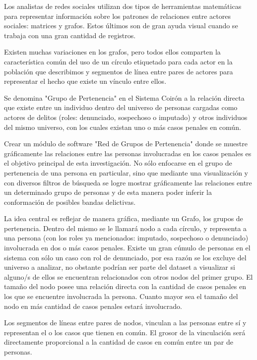 Los analistas de redes sociales utilizan dos tipos de herramientas matemáticas para representar información sobre los patrones de relaciones entre actores sociales: matrices y grafos. Estos últimos son de gran ayuda visual cuando se trabaja con una gran cantidad de registros.

Existen muchas variaciones en los grafos, pero todos ellos comparten la característica común del uso de un círculo etiquetado para cada actor en la población que describimos y segmentos de línea entre pares de actores para representar el hecho que existe un vínculo entre ellos.

Se denomina "Grupo de Pertenencia" en el Sistema Coirón a la relación directa que existe entre un individuo dentro del universo de personas cargadas como actores de delitos (roles: denunciado, sospechoso o imputado) y otros individuos del mismo universo, con los cuales existan uno o más casos penales en común.

Crear un módulo de software "Red de Grupos de Pertenencia" donde se muestre gráficamente las relaciones entre las personas involucradas en los casos penales es el objetivo principal de esta investigación. No sólo enfocarse en el grupo de pertenencia de una persona en particular, sino que mediante una visualización y con diversos filtros de búsqueda se logre mostrar gráficamente las relaciones entre un determinado grupo de personas y de esta manera poder inferir la conformación de posibles bandas delictivas.

La idea central es reflejar de manera gráfica, mediante un Grafo, los grupos de pertenencia. Dentro del mismo se le llamará nodo a cada círculo, y representa a una persona (con los roles ya mencionados: imputado, sospechoso o denunciado) involucrada en dos o más casos penales. Existe un gran cúmulo de personas en el sistema con sólo un caso con rol de denunciado, por esa razón se los excluye del universo a analizar, no obstante podrían ser parte del dataset a visualizar si alguno/s de ellos se encuentran relacionados con otros nodos del primer grupo. El tamaño del nodo posee una relación directa con la cantidad de casos penales en los que se encuentre involucrada la persona. Cuanto mayor sea el tamaño del nodo en más cantidad de casos penales estará involucrado.

Los segmentos de líneas entre pares de nodos, vinculan a las personas entre sí y representan el o los casos que tienen en común. El grosor de la vinculación será directamente proporcional a la cantidad de casos en común entre un par de personas. 

